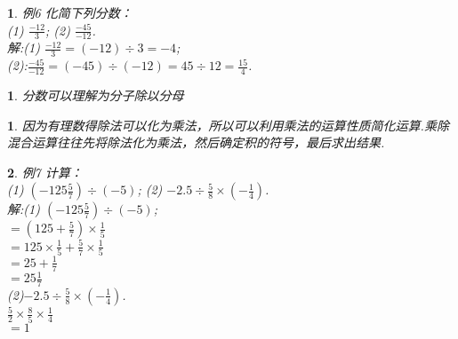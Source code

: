 \documentclass[11pt]{article}
\newtheorem{exercise}{ }
\newtheorem{article}{ }
\newtheorem{tip}{ }
\begin{document}
\begin{exercise}
例6 化简下列分数：\\
(1) $ \frac{-12}{3} $; (2) $ \frac{-45}{-12} $.\\
解:(1) $ \frac{-12}{3} = (-12) \div 3 = -4 $;\\

(2):$ \frac{-45}{-12} = (-45) \div (-12) = 45 \div 12 = \frac{15}{4} $.\\
\end{exercise}

\begin{tip}
分数可以理解为分子除以分母\\
\end{tip}

\begin{article}
因为有理数得除法可以化为乘法，所以可以利用乘法的运算性质简化运算.乘除混合运算往往先将除法化为乘法，然后确定积的符号，最后求出结果.\\
\end{article}

\begin{exercise}
例7 计算：\\
(1) $ (-125\frac{5}{7}) \div (-5) $; (2) $ -2.5 \div \frac{5}{8} \times (-\frac{1}{4}) $.\\
解:(1) $ (-125\frac{5}{7}) \div (-5) $;\\
$ =(125+ \frac{5}{7}) \times \frac{1}{5}  $\\
$ =125 \times \frac{1}{5} + \frac{5}{7} \times \frac{1}{5} $\\
$ =25 + \frac{1}{7} $\\
$ =25\frac{1}{7} $\\

(2)$ -2.5 \div \frac{5}{8} \times (-\frac{1}{4}) $.\\
$ \frac{5}{2} \times \frac{8}{5} \times \frac{1}{4} $\\
$ =1 $
\end{exercise}
\end{document}

